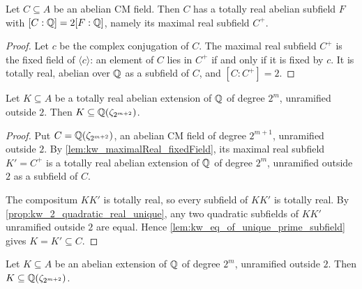 \begin{lemma}
  \label{lem:kw_maximalReal_fixedField}
  \leanok
  Let $C \subseteq A$ be an abelian CM field. Then $C$ has a totally real abelian subfield $F$
  with $[C:\mathbb{Q}] = 2[F:\mathbb{Q}]$, namely its maximal real subfield $C^+$.
\end{lemma}

\begin{proof}
  \leanok
  Let $c$ be the complex conjugation of $C$. The maximal real subfield $C^+$ is the fixed field of
  $\langle c\rangle$: an element of $C$ lies in $C^+$ if and only if it is fixed by $c$. It is
  totally real, abelian over $\mathbb{Q}$ as a subfield of $C$, and $[C:C^+] = 2$.
\end{proof}

\begin{proposition}
  \label{prop:kw_2_power_real}
  \leanok
  Let $K \subseteq A$ be a totally real abelian extension of $\mathbb{Q}$ of degree $2^m$, unramified
  outside $2$. Then $K \subseteq \mathbb{Q}(\zeta_{2^{m+2}})$.
\end{proposition}

\begin{proof}
  \leanok
  Put $C = \mathbb{Q}(\zeta_{2^{m+2}})$, an abelian CM field of degree $2^{m+1}$, unramified outside $2$.
  By \ref{lem:kw_maximalReal_fixedField}, its maximal real subfield $K' = C^+$ is a totally real
  abelian extension of $\mathbb{Q}$ of degree $2^m$, unramified outside $2$ as a subfield of $C$.

  The compositum $KK'$ is totally real, so every subfield of $KK'$ is totally real. By
  \ref{prop:kw_2_quadratic_real_unique}, any two quadratic subfields of $KK'$ unramified outside
  $2$ are equal. Hence \ref{lem:kw_eq_of_unique_prime_subfield} gives $K = K' \subseteq C$.
\end{proof}

\begin{proposition}
  \label{prop:kw_2_power}
  \leanok
  Let $K \subseteq A$ be an abelian extension of $\mathbb{Q}$ of degree $2^m$, unramified outside $2$.
  Then $K \subseteq \mathbb{Q}(\zeta_{2^{m+2}})$.
\end{proposition}

